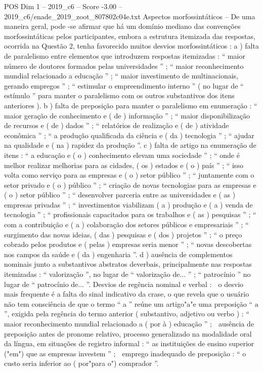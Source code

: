 \begin{textsample}{POS Dim 1 – 2019\_c6 – Score -3.00 – 2019\_c6/enade\_2019\_zoot\_807802c04e.txt}
Aspectos morfossintáticos – De uma maneira geral, pode -se afirmar que há um domínio mediano das convenções morfossintáticas pelos participantes, embora a estrutura itemizada das respostas, ocorrida na Questão 2, tenha favorecido muitos desvios morfossintáticos : a ) falta de paralelismo entre elementos que introduzem respostas itemizadas : “ maior número de doutores formados pelas universidades ” ; “ maior reconhecimento mundial relacionado a educação ” ; “ maior investimento de multinacionais, gerando empregos ” ; “ estimular o empreendimento interno ” ( no lugar de “ estímulo ” para manter o paralelismo com os outros substantivos dos itens anteriores ). b ) falta de preposição para manter o paralelismo em enumeração : “ maior geração de conhecimento e ( de ) informação ” ; “ maior disponibilização de recursos e ( de ) dados ” ; “ relatórios de realização e ( de ) atividade econômica ” ; “ a produção qualificada da ciência e ( da ) tecnologia ” ; “ ajudar na qualidade e ( na ) rapidez da produção ”. c ) falta de artigo na enumeração de itens : “ a educação e ( o ) conhecimento elevam uma sociedade ” ; “ onde é melhor realizar melhorias para as cidades, ( os ) estados e ( o ) país ” ; “ isso volta como serviço para as empresas e ( o ) setor público ” ; “ juntamente com o setor privado e ( o ) público ” ; “ criação de novas tecnologias para as empresas e ( o ) setor público ” ; “ desenvolver parceria entre as universidades e ( as ) empresas privadas ” ; “ investimentos viabilizam ( a ) produção e ( a ) venda de tecnologia ” ; “ profissionais capacitados para os trabalhos e ( as ) pesquisas ” ; “ com a contribuição e ( a ) colaboração dos setores públicos e empresariais ” ; “ surgimento das novas ideias, ( das ) pesquisas e ( dos ) projetos ” ; “ o preço cobrado pelos produtos e ( pelas ) empresas seria menor ” ; “ novas descobertas nos campos da saúde e ( da ) engenharia ”. d ) ausência de complementos nominais junto a substantivos abstratos deverbais, principalmente nas respostas itemizadas : “ valorização ”, no lugar de “ valorização de... ” ; “ patrocínio ” no lugar de “ patrocínio de... ”.
Desvios de regência nominal e verbal :  o desvio mais frequente é a falta do sinal indicativo da crase, o que revela que o usuário não tem consciência de que o termo “ a ” reúne um artigo"a"e uma preposição “ a ”, exigida pela regência do termo anterior ( substantivo, adjetivo ou verbo ) : “ maior reconhecimento mundial relacionado a ( por à ) educação ” ;  ausência de preposição antes de pronome relativo, processo generalizado na modalidade oral da língua, em situações de registro informal : “ as instituições de ensino superior ("em") que as empresas investem ” ;  emprego inadequado de preposição : “ o custo seria inferior ao ( por"para o") comprador ”.

\end{textsample}

